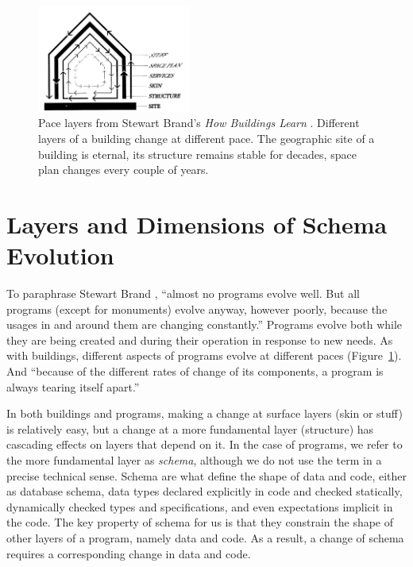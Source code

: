 \documentclass[english,crc]{programming}
\begin{document}
\begin{figure}[t]
\centering
\vspace{-1em}
\includegraphics[width=0.45\textwidth]{figures/layers.png}
\caption{Pace layers from Stewart Brand's \emph{How Buildings Learn} \cite{Brand95}.
  Different layers of a building change at different pace. The geographic
  site of a building is eternal, its structure remains stable for decades, space plan
  changes every couple of years.}
\label{fig:layers}
\end{figure}


\section{Layers and Dimensions of Schema Evolution}

To paraphrase Stewart Brand \cite{Brand95}, ``almost no programs evolve well. But all programs
(except for monuments) evolve anyway, however poorly, because the usages in and around them are
changing constantly.'' Programs evolve both while they are being created and during their operation
in response to new needs. As with buildings, different aspects of programs evolve at different paces
(Figure~\ref{fig:layers}). And ``because of the different rates of change of its components,
a program is always tearing itself apart.''


In both buildings and programs, making a change at surface layers (skin or stuff) is relatively easy,
but a change at a more fundamental layer (structure) has cascading effects on layers that depend on it.
In the case of programs, we refer to the more fundamental layer as \emph{schema}, although we do not
use the term in a precise technical sense. Schema are what define the shape of data and code, either as database schema, data types declared explicitly in code and checked statically, dynamically checked types and specifications, and even expectations implicit in the code.
The key property of schema for us is that they constrain the shape of other layers
of a program, namely data and code. As a result, a change of schema requires a
corresponding change in data and code.
\end{document}
